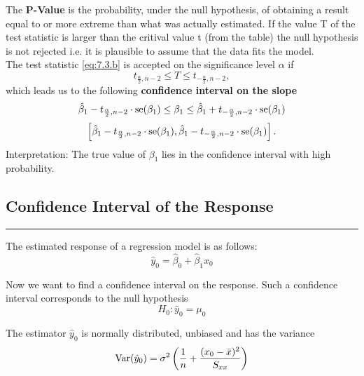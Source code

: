 The \textbf{P-Value} is the probability, under the null hypothesis, of obtaining a result equal to or more extreme than what was actually estimated. If the value T of the test statistic is larger than the critival value t (from the table) the null hypothesis is not rejected i.e. it is plausible to assume that the data fits the model.\\

The test statistic \ref{eq:7.3.b} is accepted on the significance level $\alpha$ if
\begin{equation}
  t_{\frac{\alpha}{2}, n-2} \leq T \leq t_{-\frac{\alpha}{2}, n-2},
\end{equation}
which leads us to the following \textbf{confidence interval on the slope}
\begin{equation}
  \hat{\beta}_1 - t_{\frac{\alpha}{2}, n-2} \cdot \textup{se}(\beta_1)
  \leq \beta_1 \leq
  \hat{\beta}_1 + t_{-\frac{\alpha}{2}, n-2} \cdot \textup{se}(\beta_1)
\end{equation}
\begin{equation}
  \left[
  \hat{\beta}_1 - t_{\frac{\alpha}{2}, n-2} \cdot \textup{se}(\beta_1),
  \hat{\beta}_1 - t_{-\frac{\alpha}{2}, n-2} \cdot \textup{se}(\beta_1)\right].
\end{equation}
Interpretation: The true value of $\beta_1$ lies in the confidence interval with high probability.

\subsection{Confidence Interval of the Response}
\noindent\rule[\linienAbstand]{\linewidth}{\linienDicke}
The estimated response of a regression model is as follows:
\begin{equation}
  \hat{y}_0 = \hat{\beta}_0 +  \hat{\beta}_1 x_0
\end{equation}

Now we want to find a confidence interval on the response. Such a confidence interval corresponds to the null hypothesis
\begin{equation}
  H_0: \hat{y}_0 = \mu_0
\end{equation}

The estimator $\hat{y}_0$ is normally distributed, unbiased and has the variance
\begin{equation}
  \textup{Var}(\hat{y}_0) = \sigma^2\left(\frac{1}{n} + \frac{(x_0 - \bar{x})^2}{S_{xx}}\right)
\end{equation}

